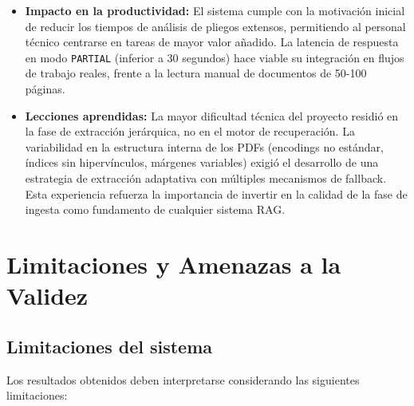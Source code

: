 \begin{itemize}
    \item \textbf{Impacto en la productividad:} El sistema cumple con la motivación inicial de reducir los tiempos de análisis de pliegos extensos, permitiendo al personal técnico centrarse en tareas de mayor valor añadido. La latencia de respuesta en modo \texttt{PARTIAL} (inferior a 30 segundos) hace viable su integración en flujos de trabajo reales, frente a la lectura manual de documentos de 50-100 páginas.

    \item \textbf{Lecciones aprendidas:} La mayor dificultad técnica del proyecto residió en la fase de extracción jerárquica, no en el motor de recuperación. La variabilidad en la estructura interna de los PDFs (encodings no estándar, índices sin hipervínculos, márgenes variables) exigió el desarrollo de una estrategia de extracción adaptativa con múltiples mecanismos de fallback. Esta experiencia refuerza la importancia de invertir en la calidad de la fase de ingesta como fundamento de cualquier sistema RAG.
\end{itemize}

\section{Limitaciones y Amenazas a la Validez}

\subsection{Limitaciones del sistema}

Los resultados obtenidos deben interpretarse considerando las siguientes limitaciones:

